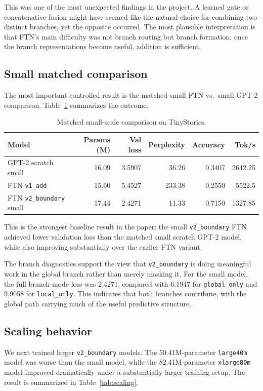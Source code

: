 \documentclass[11pt]{article}
\begin{document}
This was one of the most unexpected findings in the project. A learned gate or concatenative fusion might have seemed like the natural choice for combining two distinct branches, yet the opposite occurred. The most plausible interpretation is that FTN's main difficulty was not branch routing but branch formation: once the branch representations become useful, addition is sufficient.

\subsection{Small matched comparison}
The most important controlled result is the matched small FTN vs.\ small GPT-2 comparison. Table~\ref{tab:small-main} summarizes the outcome.

\begin{table}[ht]
    \centering
    \caption{Matched small-scale comparison on TinyStories.}
    \label{tab:small-main}
    \begin{tabular}{lrrrrr}
        \toprule
        Model & Params (M) & Val loss & Perplexity & Accuracy & Tok/s \\
        \midrule
        GPT-2 scratch small & 16.09 & 3.5907 & 36.26 & 0.3407 & 2642.25 \\
        FTN \texttt{v1\_add} & 15.60 & 5.4527 & 233.38 & 0.2550 & 5522.5 \\
        FTN \texttt{v2\_boundary} small & 17.44 & 2.4271 & 11.33 & 0.7150 & 1327.85 \\
        \bottomrule
    \end{tabular}
\end{table}

This is the strongest baseline result in the paper: the small \texttt{v2\_boundary} FTN achieved lower validation loss than the matched small scratch GPT-2 model, while also improving substantially over the earlier FTN variant.

The branch diagnostics support the view that \texttt{v2\_boundary} is doing meaningful work in the global branch rather than merely masking it. For the small model, the full branch-mode loss was 2.4271, compared with 6.1947 for \texttt{global\_only} and 9.9058 for \texttt{local\_only}. This indicates that both branches contribute, with the global path carrying much of the useful predictive structure.

\subsection{Scaling behavior}
We next trained larger \texttt{v2\_boundary} models. The 50.41M-parameter \texttt{large40m} model was worse than the small model, while the 82.41M-parameter \texttt{xlarge80m} model improved dramatically under a substantially larger training setup. The result is summarized in Table~\ref{tab:scaling}.
\end{document}
